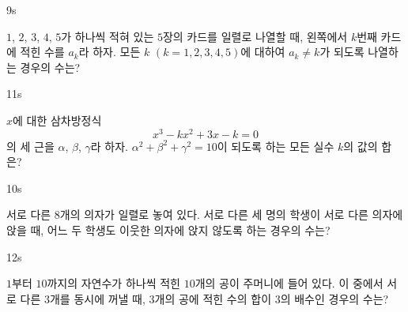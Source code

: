 \documentclass[10pt]{article}
\begin{document}
\begin{pagepair}
\noindent
\begin{minipage}[t][\probboxheight][t]{0.46\linewidth}
\begin{problem}{9}{s}
\par\smallskip
$1$, $2$, $3$, $4$, $5$가 하나씩 적혀 있는 $5$장의 카드를 일렬로 나열할 때, 왼쪽에서 $k$번째 카드에 적힌 수를 $a_k$라 하자. 모든 $k$ $(k = 1, 2, 3, 4, 5)$에 대하여 $a_k \ne k$가 되도록 나열하는 경우의 수는?
\begin{choices}
\end{choices}
\end{problem}
\end{minipage}\hfill
\begin{minipage}[t][\probboxheight][t]{0.46\linewidth}
\begin{problem}{11}{s}
\par\smallskip
$x$에 대한 삼차방정식
\[ x^3 - kx^2 + 3x - k = 0 \]
의 세 근을 $\alpha$, $\beta$, $\gamma$라 하자. $\alpha^2 + \beta^2 + \gamma^2 = 10$이 되도록 하는 모든 실수 $k$의 값의 합은?
\begin{choices}
\end{choices}
\end{problem}
\end{minipage}
\par\vspace{4mm}
\noindent
\begin{minipage}[t][\probboxheight][t]{0.46\linewidth}
\begin{problem}{10}{s}
\par\smallskip
서로 다른 $8$개의 의자가 일렬로 놓여 있다. 서로 다른 세 명의 학생이 서로 다른 의자에 앉을 때, 어느 두 학생도 이웃한 의자에 앉지 않도록 하는 경우의 수는?
\begin{choices}
\end{choices}
\end{problem}
\end{minipage}\hfill
\begin{minipage}[t][\probboxheight][t]{0.46\linewidth}
\begin{problem}{12}{s}
\par\smallskip
$1$부터 $10$까지의 자연수가 하나씩 적힌 $10$개의 공이 주머니에 들어 있다. 이 중에서 서로 다른 $3$개를 동시에 꺼낼 때, $3$개의 공에 적힌 수의 합이 $3$의 배수인 경우의 수는?
\begin{choices}
\end{choices}
\end{problem}
\end{minipage}
\end{pagepair}
\end{document}
